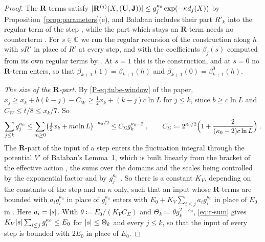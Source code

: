 \documentclass[11pt]{preprint}
\DeclarePairedDelimiter{\abs}{\lvert}{\rvert}
\numberwithin{equation}{section}
\theoremstyle{definition}
\theoremstyle{remark}
\theoremstyle{plain}
\begin{document}
\begin{proof}
The $\mathbf R$-terms satisfy $\abs{\mathbf R^{(j)}(X, (\mathbf U, \mathbf J))} \leq g_j^{\kappa_0}\exp(-\kappa d_j(X))$ by Proposition~\ref{prop:parameters}(e), and Ba{\l}aban includes their part $R'_k$ into the regular term of the step \cite[p.~271]{BalabanCRE}, while the part which stays an $\mathbf R$-term needs no counterterm \cite[pp.~260, 276]{BalabanCRE}. For $s \in \mathbb C$ we run the regular recursion of the construction along $h$ with $sR'$ in place of $R'$ at every step, and with the coefficients $\beta_j(s)$ computed from its own regular terms by \cite[(3.57), (3.61), pp.~281--282]{BalabanCRE}. At $s = 1$ this is the construction, and at $s = 0$ no $\mathbf R$-term enters, so that $\beta_{k+1}(1) = \beta_{k+1}(h)$ and $\beta_{k+1}(0) = \beta^0_{k+1}(h)$.

\emph{The size of the $\mathbf R$-part.} By \eqref{P-eq:tube-window} of the paper, $x_j \geq x_k + b(k - j) - C_W \geq \frac12x_k + (k - j)c\ln L$ for $j \leq k$, since $b \geq c\ln L$ and $C_W \leq t/8 \leq x_k/7$. So
\begin{equation}\label{eq:r-sum}
    \sum_{j \leq k}g_j^{\kappa_0} \leq \sum_{m \geq 0}\bigl(\tfrac12x_k + mc\ln L\bigr)^{-\kappa_0/2} \leq C_\Sigma g_k^{\kappa_0-2}\;,
    \qquad
    C_\Sigma \coloneqq 2^{\kappa_0/2}\Bigl(1 + \frac{2}{(\kappa_0 - 2)c\ln L}\Bigr)\;.
\end{equation}
The $\mathbf R$-part of the input of a step enters the fluctuation integral through the potential $V'$ of Ba{\l}aban's Lemma~1, which is built linearly from the bracket of the effective action \cite[(1.33)]{BalabanRG2}, the sums over the domains and the scales being controlled by the exponential factor and by $g_j^{\kappa_0}$ \cite[p.~260]{BalabanCRE}. So there is a constant $K_V$, depending on the constants of the step and on $\kappa$ only, such that an input whose $\mathbf R$-terms are bounded with $a_ig_i^{\kappa_0}$ in place of $g_i^{\kappa_0}$ enters with $E_0 + K_V\sum_{i \leq j}a_ig_i^{\kappa_0}$ in place of $E_0$ in \cite[(1.36), p.~9]{BalabanRG2}. Here $a_i = \abs{s}$. With $\theta \coloneqq E_0/(K_VC_\Sigma)$ and $\Theta_k \coloneqq \theta g_k^{2-\kappa_0}$, \eqref{eq:r-sum} gives $K_V\abs{s}\sum_{i \leq j}g_i^{\kappa_0} \leq E_0$ for $\abs{s} \leq \Theta_k$ and every $j \leq k$, so that the input of every step is bounded with $2E_0$ in place of $E_0$.


\end{proof}
\end{document}
